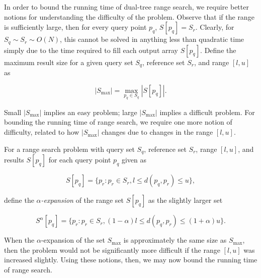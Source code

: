 In order to bound the running time of dual-tree range search, we require better
notions for understanding the difficulty of the problem.  Observe that if the
range is sufficiently large, then for every query point $p_q$, $S[p_q] = S_r$.
Clearly, for $S_q \sim S_r \sim O(N)$, this cannot be solved in anything less
than quadratic time simply due to the time required to fill each output array
$S[p_q]$.  Define the maximum result size for a given query set $S_q$, reference
set $S_r$, and range $[l, u]$ as

\begin{equation}
| S_{\max} | = \max_{p_q \in S_q} | S[p_q] |.
\label{eqn:smax}
\end{equation}

Small $| S_{\max} |$ implies an easy problem; large $| S_{\max} |$ implies a
difficult problem.  For bounding the running time of range search, we require
one more notion of difficulty, related to how $| S_{\max} |$ changes due to
changes in the range $[l, u]$.

\begin{defn}
For a range search problem with query set $S_q$, reference set $S_r$, range $[l,
u]$, and results $S[p_q]$ for each query point $p_q$ given as

\begin{equation}
S[p_q] = \{ p_r : p_r \in S_r, l \le d(p_q, p_r) \le u \},
\end{equation}

\noindent define the {\it $\alpha$-expansion} of the range set $S[p_q]$ as the slightly larger set

\begin{equation}
S^{\alpha}[p_q] = \{ p_r : p_r \in S_r, (1 - \alpha) l \le d(p_q, p_r) \le (1 +
\alpha) u \}.
\end{equation}
\end{defn}

When the $\alpha$-expansion of the set $S_{\max}$ is approximately the same size
as $S_{\max}$, then the problem would not be significantly more difficult if the
range $[l, u]$ was increased slightly.  Using these notions, then, we may now
bound the running time of range search.

